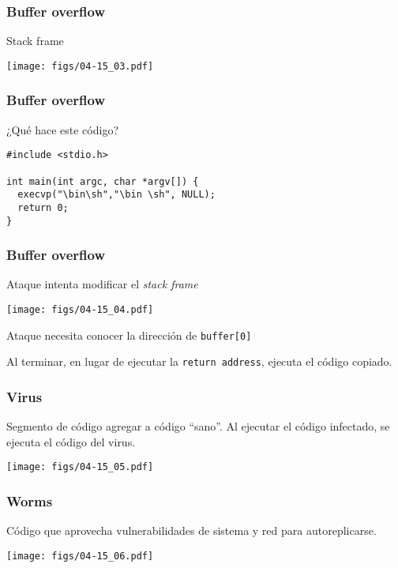 \documentclass[letter]{beamer}
\begin{document}
\begin{frame}
  \frametitle{Buffer overflow}

  Stack frame

  \begin{center}
    \texttt{[image: figs/04-15\_03.pdf]}
  \end{center}

\end{frame}
\begin{frame}[fragile]
  \frametitle{Buffer overflow}

  ¿Qué hace este código?

\begin{verbatim}
#include <stdio.h>

int main(int argc, char *argv[]) {
  execvp("\bin\sh","\bin \sh", NULL);
  return 0;
}

\end{verbatim}

\end{frame}
\begin{frame}
  \frametitle{Buffer overflow}

  Ataque intenta modificar el {\em stack frame}
  
  \begin{center}
    \texttt{[image: figs/04-15\_04.pdf]}
  \end{center}

  Ataque necesita conocer la dirección de {\tt buffer[0]}
  
  Al terminar, en lugar de ejecutar la {\tt return address}, ejecuta el código copiado.
\end{frame}

\begin{frame}
  \frametitle{Virus}

  Segmento de código agregar a código ``sano''. Al ejecutar el código infectado, se ejecuta 
  el código del virus.

  \begin{center}
    \texttt{[image: figs/04-15\_05.pdf]}
  \end{center}
  
  
\end{frame}
\begin{frame}
  \frametitle{Worms}

  Código que aprovecha vulnerabilidades de sistema y red para autoreplicarse.
  
  \begin{center}
    \texttt{[image: figs/04-15\_06.pdf]}
  \end{center}
  
  
\end{frame}



\end{document}
